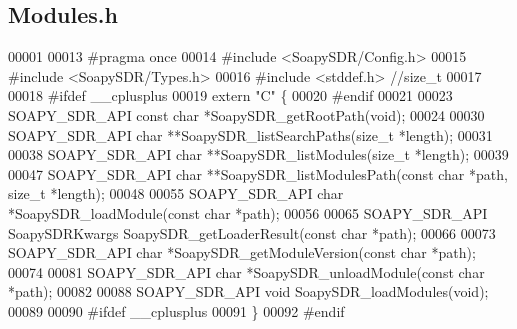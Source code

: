 \subsection{Modules.\+h}
\label{Modules_8h_source}

\begin{DoxyCode}
00001 
00013 \textcolor{preprocessor}{#pragma once}
00014 \textcolor{preprocessor}{#include <SoapySDR/Config.h>}
00015 \textcolor{preprocessor}{#include <SoapySDR/Types.h>}
00016 \textcolor{preprocessor}{#include <stddef.h>} \textcolor{comment}{//size\_t}
00017 
00018 \textcolor{preprocessor}{#ifdef \_\_cplusplus}
00019 \textcolor{keyword}{extern} \textcolor{stringliteral}{"C"} \{
00020 \textcolor{preprocessor}{#endif}
00021 
00023 SOAPY_SDR_API \textcolor{keyword}{const} \textcolor{keywordtype}{char} *SoapySDR_getRootPath(\textcolor{keywordtype}{void});
00024 
00030 SOAPY_SDR_API \textcolor{keywordtype}{char} **SoapySDR_listSearchPaths(\textcolor{keywordtype}{size\_t} *length);
00031 
00038 SOAPY_SDR_API \textcolor{keywordtype}{char} **SoapySDR_listModules(\textcolor{keywordtype}{size\_t} *length);
00039 
00047 SOAPY_SDR_API \textcolor{keywordtype}{char} **SoapySDR_listModulesPath(\textcolor{keyword}{const} \textcolor{keywordtype}{char} *path, \textcolor{keywordtype}{size\_t} *length);
00048 
00055 SOAPY_SDR_API \textcolor{keywordtype}{char} *SoapySDR_loadModule(\textcolor{keyword}{const} \textcolor{keywordtype}{char} *path);
00056 
00065 SOAPY_SDR_API SoapySDRKwargs SoapySDR_getLoaderResult(\textcolor{keyword}{const} \textcolor{keywordtype}{char} *path);
00066 
00073 SOAPY_SDR_API \textcolor{keywordtype}{char} *SoapySDR_getModuleVersion(\textcolor{keyword}{const} \textcolor{keywordtype}{char} *path);
00074 
00081 SOAPY_SDR_API \textcolor{keywordtype}{char} *SoapySDR_unloadModule(\textcolor{keyword}{const} \textcolor{keywordtype}{char} *path);
00082 
00088 SOAPY_SDR_API \textcolor{keywordtype}{void} SoapySDR_loadModules(\textcolor{keywordtype}{void});
00089 
00090 \textcolor{preprocessor}{#ifdef \_\_cplusplus}
00091 \}
00092 \textcolor{preprocessor}{#endif}
\end{DoxyCode}
